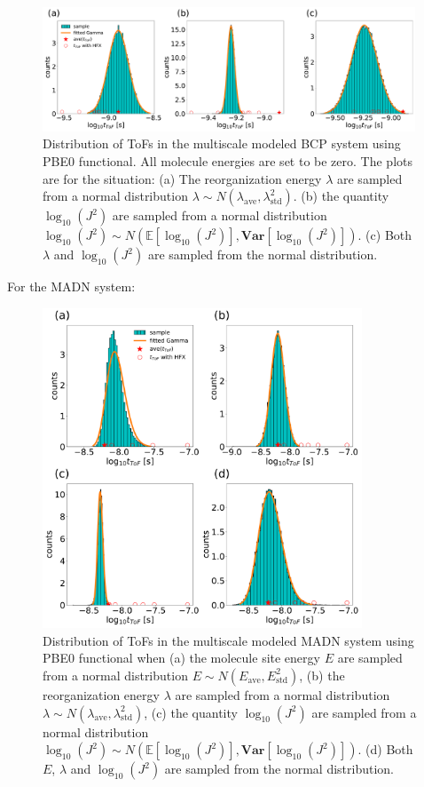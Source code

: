 \documentclass[letterpaper,12pt]{article}
\begin{document}
\begin{figure}[H]
    \centering
    \includegraphics[width=0.99\textwidth]{figs/BCP_HFX/fig_mle_BCP_noE.pdf}
    \caption{Distribution of ToFs in the multiscale modeled BCP system using PBE0 functional. All molecule energies are set to be zero.  
    The plots are for the situation: (a) The reorganization energy $\lambda$ are sampled from a normal distribution $\lambda \sim N(\lambda_\text{ave},\lambda^2_\text{std})$. (b) the quantity $\log_{10}(J^2)$ are sampled from a normal distribution $\log_{10}(J^2) \sim N(\mathbb{E}[\log_{10}(J^2)], \textbf{Var}[\log_{10}(J^2)] )$. (c) Both $\lambda$ and $\log_{10}(J^2)$ are sampled from the normal distribution. }
    \label{fig:mle_BCP_noE}
\end{figure}

For the MADN system:
\begin{figure}[H]
    \centering
    \includegraphics[width=0.85\textwidth]{figs/MADN_HFX/fig_mle_MADN_withE.pdf}
    \caption{Distribution of ToFs in the multiscale modeled MADN system using PBE0 functional when (a) the molecule site energy $E$ are sampled from a normal distribution $E \sim N(E_\text{ave},E^2_\text{std})$, (b) the reorganization energy $\lambda$ are sampled from a normal distribution $\lambda \sim N(\lambda_\text{ave},\lambda^2_\text{std})$, (c) the quantity $\log_{10}(J^2)$ are sampled from a normal distribution $\log_{10}(J^2) \sim N(\mathbb{E}[\log_{10}(J^2)], \textbf{Var}[\log_{10}(J^2)] )$. (d) Both $E$, $\lambda$ and $\log_{10}(J^2)$ are sampled from the normal distribution. }
    \label{fig:mle_MADN_withE}
\end{figure}
\end{document}
